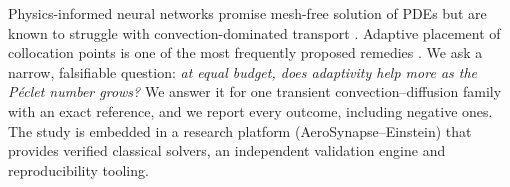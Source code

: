 Physics-informed neural networks promise mesh-free solution of PDEs but are known to struggle with
convection-dominated transport \citep{krishnapriyan2021failure}. Adaptive placement of collocation points is
one of the most frequently proposed remedies \citep{lu2021deepxde,wu2023sampling,daw2022r3}. We ask a narrow,
falsifiable question: \emph{at equal budget, does adaptivity help more as the P\'eclet number grows?} We answer
it for one transient convection--diffusion family with an exact reference, and we report every outcome,
including negative ones. The study is embedded in a research platform (AeroSynapse--Einstein) that provides
verified classical solvers, an independent validation engine and reproducibility tooling.
